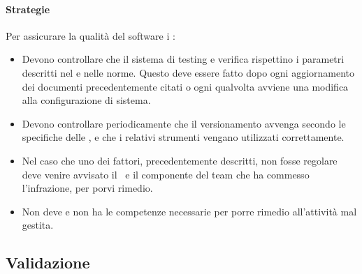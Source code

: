 \documentclass[../NormeDiProgetto_v4.0.0.tex]{subfiles}
\begin{document}
				\paragraph{Strategie}
				Per assicurare la qualità del software i \verificatori:
				\begin{itemize}
					\item Devono controllare che il sistema di testing e verifica rispettino i parametri descritti nel \pianodiqualifica e nelle norme. Questo deve essere fatto dopo ogni aggiornamento dei documenti precedentemente citati o ogni qualvolta avviene una modifica alla configurazione di sistema.  
					\item Devono controllare periodicamente che il versionamento avvenga secondo le specifiche delle \normediprogetto, e che i relativi strumenti vengano utilizzati correttamente.
					\item Nel caso che uno dei fattori, precedentemente descritti, non fosse regolare deve venire avvisato il \responsabilediprogetto\ e il componente del team che ha commesso l'infrazione, per porvi rimedio.
					\item Non deve e non ha le competenze necessarie per porre rimedio all'attività mal gestita.
				\end{itemize}



		
		\subsection{Validazione}
\end{document}
